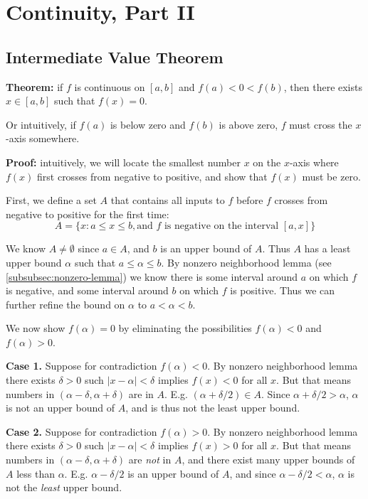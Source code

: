 \section{Continuity, Part II}

\subsection{Intermediate Value Theorem}\label{ivt}
\textbf{Theorem:} if $f$ is continuous on $[a,b]$ and $f(a)<0<f(b)$,
then there exists $x\in[a,b]$ such that $f(x)=0$.

\vs

Or intuitively, if $f(a)$ is below zero and $f(b)$ is above zero, $f$
must cross the $x$-axis somewhere.

\vs

\textbf{Proof:} intuitively, we will locate the smallest number $x$ on
the $x$-axis where $f(x)$ first crosses from negative to positive, and
show that $f(x)$ must be zero.

\vs

First, we define a set $A$ that contains all inputs to $f$ before $f$
crosses from negative to positive for the first time:
\[A=\{x:a\leq x\leq b, \text{and $f$ is negative on the interval
    $[a,x]$}\}\]

We know $A\neq\emptyset$ since $a\in A$, and $b$ is an upper bound of
$A$. Thus $A$ has a least upper bound $\alpha$ such that
$a\leq\alpha\leq b$. By nonzero neighborhood lemma (see
\ref{subsubsec:nonzero-lemma}) we know there is some interval around
$a$ on which $f$ is negative, and some interval around $b$ on which
$f$ is positive. Thus we can further refine the bound on $\alpha$ to
$a<\alpha<b$.

\vs

We now show $f(\alpha)=0$ by eliminating the possibilities
$f(\alpha)<0$ and $f(\alpha)>0$.

\vs

\textbf{Case 1.} Suppose for contradiction $f(\alpha)<0$. By nonzero
neighborhood lemma there exists $\delta>0$ such $|x-\alpha|<\delta$ implies
$f(x)<0$ for all $x$. But that means numbers in
$(\alpha-\delta, \alpha+\delta)$ are in $A$. E.g.
$(\alpha+\delta/2)\in A$. Since $\alpha+\delta/2>\alpha$, $\alpha$ is not an upper bound of
$A$, and is thus not the least upper bound.

\vs


\textbf{Case 2.} Suppose for contradiction $f(\alpha)>0$. By nonzero
neighborhood lemma there exists $\delta>0$ such $|x-\alpha|<\delta$ implies
$f(x)>0$ for all $x$. But that means numbers in
$(\alpha-\delta, \alpha+\delta)$ are \textit{not} in $A$, and there exist many upper
bounds of $A$ less than $\alpha$. E.g. $\alpha-\delta/2$ is an upper bound of
$A$, and since $\alpha-\delta/2<\alpha$, $\alpha$ is not the \textit{least} upper bound.

